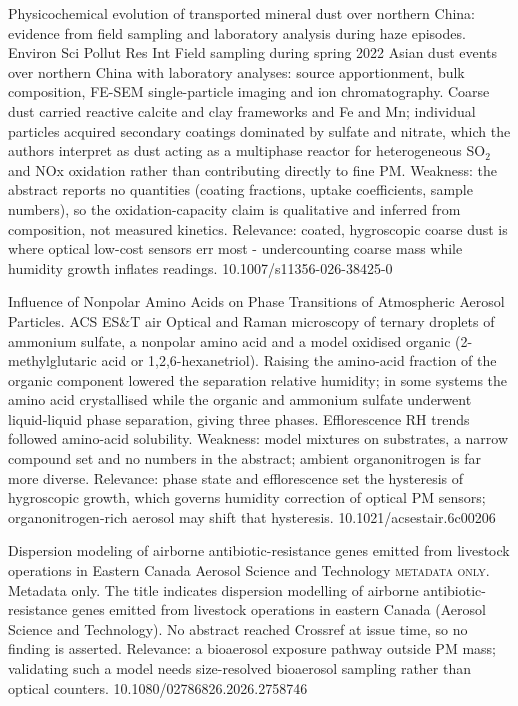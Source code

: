 \documentclass[10pt]{article}
\begin{document}
{Physicochemical evolution of transported mineral dust over northern China: evidence from field sampling and laboratory analysis during haze episodes.}
{Environ Sci Pollut Res Int}
{Field sampling during spring 2022 Asian dust events over northern China with laboratory analyses: source apportionment, bulk composition, FE-SEM single-particle imaging and ion chromatography. Coarse dust carried reactive calcite and clay frameworks and Fe and Mn; individual particles acquired secondary coatings dominated by sulfate and nitrate, which the authors interpret as dust acting as a multiphase reactor for heterogeneous SO$_2$ and NOx oxidation rather than contributing directly to fine PM. Weakness: the abstract reports no quantities (coating fractions, uptake coefficients, sample numbers), so the oxidation-capacity claim is qualitative and inferred from composition, not measured kinetics. Relevance: coated, hygroscopic coarse dust is where optical low-cost sensors err most - undercounting coarse mass while humidity growth inflates readings.}
{10.1007/s11356-026-38425-0}

{Influence of Nonpolar Amino Acids on Phase Transitions of Atmospheric Aerosol Particles.}
{ACS ES\&T air}
{Optical and Raman microscopy of ternary droplets of ammonium sulfate, a nonpolar amino acid and a model oxidised organic (2-methylglutaric acid or 1,2,6-hexanetriol). Raising the amino-acid fraction of the organic component lowered the separation relative humidity; in some systems the amino acid crystallised while the organic and ammonium sulfate underwent liquid-liquid phase separation, giving three phases. Efflorescence RH trends followed amino-acid solubility. Weakness: model mixtures on substrates, a narrow compound set and no numbers in the abstract; ambient organonitrogen is far more diverse. Relevance: phase state and efflorescence set the hysteresis of hygroscopic growth, which governs humidity correction of optical PM sensors; organonitrogen-rich aerosol may shift that hysteresis.}
{10.1021/acsestair.6c00206}

{Dispersion modeling of airborne antibiotic-resistance genes emitted from livestock operations in Eastern Canada}
{Aerosol Science and Technology}
{\textsc{metadata only.} Metadata only. The title indicates dispersion modelling of airborne antibiotic-resistance genes emitted from livestock operations in eastern Canada (Aerosol Science and Technology). No abstract reached Crossref at issue time, so no finding is asserted. Relevance: a bioaerosol exposure pathway outside PM mass; validating such a model needs size-resolved bioaerosol sampling rather than optical counters.}
{10.1080/02786826.2026.2758746}
\end{document}
